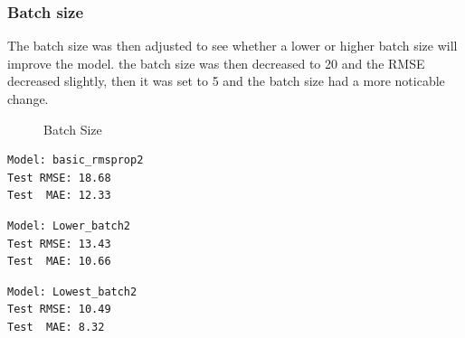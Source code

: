 \documentclass[10pt,11pt,12pt,oneside]{book}
\begin{document}
\subsubsection{Batch size}
The batch size was then adjusted to see whether a lower or higher batch size will improve the model. the batch size was then decreased to 20 and the RMSE decreased slightly, then it was set to 5 and the batch size had a more noticable change.\\
\begin{figure}[H]
    \centering
    \qquad
    \caption{Batch Size}%
    \label{fig:batch}%
\end{figure}
\begin{multicols}{3}
\centering
\begin{verbatim}
Model: basic_rmsprop2
Test RMSE: 18.68
Test  MAE: 12.33
\end{verbatim}
\begin{verbatim}
Model: Lower_batch2
Test RMSE: 13.43
Test  MAE: 10.66
\end{verbatim}
\begin{verbatim}
Model: Lowest_batch2
Test RMSE: 10.49
Test  MAE: 8.32
\end{verbatim}
\end{multicols}
\pagebreak
\end{document}
